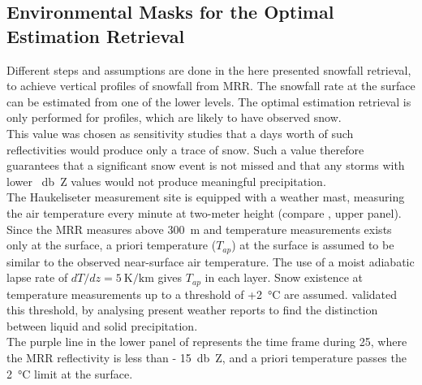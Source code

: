 \subsection{Environmental Masks for the Optimal Estimation Retrieval}\label{sec:pre_snow}

\noindent
Different steps and assumptions are done in the here presented snowfall retrieval, to achieve vertical profiles of snowfall from MRR. The snowfall rate at the surface can be estimated from one of the lower levels. The optimal estimation retrieval is only performed for profiles, which are likely to have observed snow. 
\\
This value was  chosen as sensitivity studies \citep[e.g.][]{wood_level_2013} that a days worth of such reflectivities would produce only a trace of snow.  Such a value therefore guarantees that a significant snow event is not missed and that any storms with lower \SI{}{\decibel Z} values would not produce meaningful precipitation.
\\
The Haukeliseter measurement site is equipped with a weather mast, measuring the air temperature every minute at two-meter height (compare , upper panel). 
%
Since the MRR measures above \SI{300}{\metre} and temperature measurements exists only at the surface, a priori temperature ($T_{ap}$) at the surface is assumed to be similar to the observed near-surface air temperature. The use of a moist adiabatic lapse rate of $dT/dz = \SI{5}{\kelvin\per\km}$ gives $T_{ap}$ in each layer. 
Snow existence at temperature measurements up to a threshold of +\SI{2}{\celsius} are assumed. \citet{liu_g._deriving_2008} validated this threshold, by analysing present weather reports to find the distinction between liquid and solid precipitation.\\
The purple line in the lower panel of  represents the time frame during \SI{25}{\dec}, where the MRR reflectivity is less than \SI{- 15}{\decibel Z}, and a priori temperature passes the \SI{2}{\celsius} limit at the surface.  

